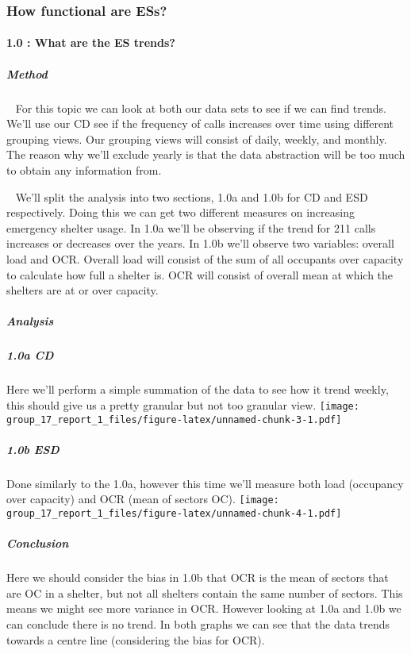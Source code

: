 \documentclass[
]{article}
\begin{document}
\hypertarget{how-functional-are-ess}{%
\subsubsection{How functional are ESs?}\label{how-functional-are-ess}}

\hypertarget{what-are-the-es-trends}{%
\paragraph{1.0 : What are the ES trends?}\label{what-are-the-es-trends}}

\hypertarget{method}{%
\subparagraph{Method}\label{method}}

~ For this topic we can look at both our data sets to see if we can find
trends. We'll use our CD see if the frequency of calls increases over
time using different grouping views. Our grouping views will consist of
daily, weekly, and monthly. The reason why we'll exclude yearly is that
the data abstraction will be too much to obtain any information from.

~ We'll split the analysis into two sections, 1.0a and 1.0b for CD and
ESD respectively. Doing this we can get two different measures on
increasing emergency shelter usage. In 1.0a we'll be observing if the
trend for 211 calls increases or decreases over the years. In 1.0b we'll
observe two variables: overall load and OCR. Overall load will consist
of the sum of all occupants over capacity to calculate how full a
shelter is. OCR will consist of overall mean at which the shelters are
at or over capacity.

\hypertarget{analysis}{%
\subparagraph{Analysis}\label{analysis}}

\hypertarget{a-cd}{%
\subparagraph{1.0a CD}\label{a-cd}}

Here we'll perform a simple summation of the data to see how it trend
weekly, this should give us a pretty granular but not too granular view.
\texttt{[image: group\_17\_report\_1\_files/figure-latex/unnamed-chunk-3-1.pdf]}

\hypertarget{b-esd}{%
\subparagraph{1.0b ESD}\label{b-esd}}

Done similarly to the 1.0a, however this time we'll measure both load
(occupancy over capacity) and OCR (mean of sectors OC).
\texttt{[image: group\_17\_report\_1\_files/figure-latex/unnamed-chunk-4-1.pdf]}

\hypertarget{conclusion}{%
\subparagraph{Conclusion}\label{conclusion}}

Here we should consider the bias in 1.0b that OCR is the mean of sectors
that are OC in a shelter, but not all shelters contain the same number
of sectors. This means we might see more variance in OCR. However
looking at 1.0a and 1.0b we can conclude there is no trend. In both
graphs we can see that the data trends towards a centre line
(considering the bias for OCR).
\end{document}
